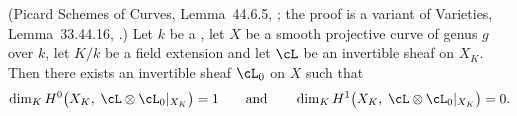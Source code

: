 \begin{lemma}
\label{lem:pc-twist}
(Picard Schemes of Curves, Lemma~44.6.5,
; the proof is a
variant of Varieties, Lemma~33.44.16,
.)
Let $k$ be a ,
let $X$ be a smooth projective curve of genus $g$ over $k$, let $K/k$ be
a field extension and let $\cL$ be an invertible sheaf on $X_K$.  Then
there exists an invertible sheaf $\cL_0$ on $X$ such that
\[
\dim_KH^0\bigl(X_K,\;\cL\otimes\cL_0|_{X_K}\bigr)=1
\qquad\text{and}\qquad
\dim_KH^1\bigl(X_K,\;\cL\otimes\cL_0|_{X_K}\bigr)=0 .
\]
\end{lemma}

